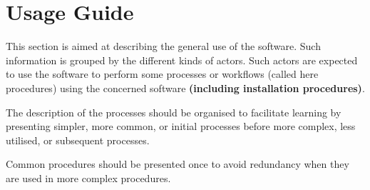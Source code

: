 \chapter{Usage Guide}
\label{chap:usage_guide}

This section is aimed at describing the general use of the software. Such
information is grouped by the different kinds of actors.
Such actors are expected to use the software to perform some
processes or workflows (called here procedures) using the concerned software
\textbf{(including installation procedures)}.

The description of the processes should be organised to facilitate learning by
presenting simpler, more common, or initial processes before more complex, less
utilised, or subsequent processes.

Common procedures should be presented once to avoid redundancy when they are
used in more complex procedures. 

